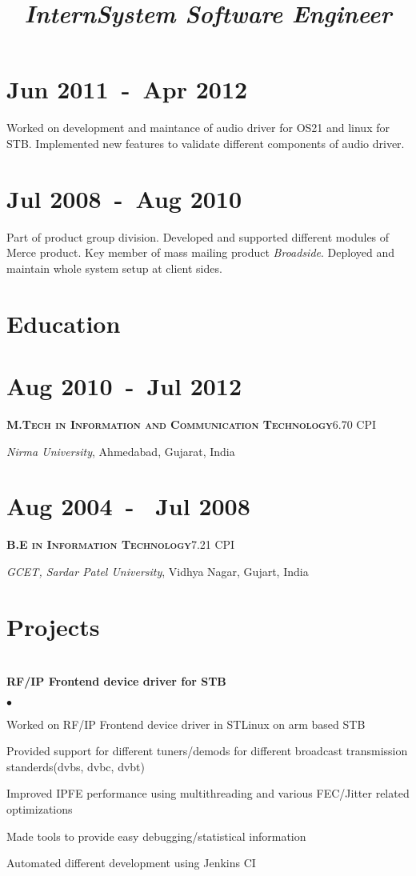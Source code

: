 \documentclass[margin,line]{res}
\newcommand{\datesection}[1]{\section{\textnormal{\scriptsize \textcolor{subtle}{#1}}}}
\newenvironment{list1}{
  \begin{list}{\ding{113}}{%
      \setlength{\itemsep}{0in}
      \setlength{\parsep}{0in} \setlength{\parskip}{0in}
      \setlength{\topsep}{0in} \setlength{\partopsep}{0in}
      \setlength{\leftmargin}{0.17in}}}{\end{list}}
\newenvironment{list2}{
  \begin{list}{$\bullet$}{%
      \setlength{\itemsep}{0in}
      \setlength{\parsep}{0in} \setlength{\parskip}{0in}
      \setlength{\topsep}{0in} \setlength{\partopsep}{0in}
      \setlength{\leftmargin}{0.2in}}}{\end{list}}
\begin{document}
\begin{resume}
\datesection{Jun 2011~-~Apr 2012}
\title{\em Intern}
\begin{position}
Worked on development and maintance of audio driver for OS21 and linux for STB.
Implemented new features to validate different components of audio driver.
\end{position}

\datesection{Jul 2008~-~Aug 2010}
\title{\em System Software Engineer}
\begin{position}
Part of product group division. Developed and supported different modules of Merce product.
Key member of mass mailing product {\em Broadside}. Deployed and maintain whole system setup at client sides.
\end{position}

\section{\sc Education}
\datesection{Aug 2010~-~Jul 2012}
\textsc{\bf M.Tech in Information and Communication Technology}\hfill{6.70 CPI}\\
\vspace*{-.1in}
\begin{list1}
\item[] {\em Nirma University}, Ahmedabad, Gujarat, India
\end{list1}

\datesection{Aug 2004~-~ Jul 2008}
\textsc{\bf B.E in Information Technology}\hfill{7.21 CPI}\\
\vspace*{-.1in}
\begin{list1}
\item[] {\em GCET, Sardar Patel University}, Vidhya Nagar, Gujart, India\
\end{list1}



\section{\sc Projects}
\datesection{}
{\bf RF/IP Frontend device driver for STB}\\
\begin{list2}
\item Worked on RF/IP Frontend device driver in STLinux on arm based STB
\item Provided support for different tuners/demods for different broadcast transmission standerds(dvbs, dvbc, dvbt)
\item Improved IPFE performance using multithreading and various FEC/Jitter related optimizations
\item Made tools to provide easy debugging/statistical information
\item Automated different development using Jenkins CI
\end{list2}


\end{resume}
\end{document}
